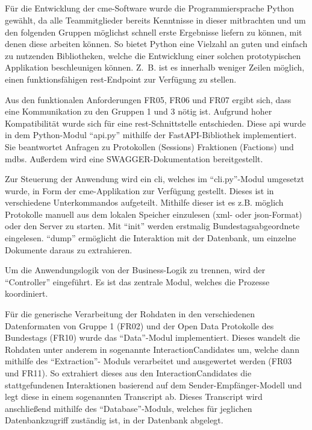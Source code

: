 \subsection{}
Für die Entwicklung der \gls{cme}-Software wurde die Programmiersprache Python
gewählt, da alle Teammitglieder bereits Kenntnisse in dieser mitbrachten und
um den folgenden Gruppen möglichst schnell erste Ergebnisse liefern zu können,
mit denen diese arbeiten können. So bietet Python eine Vielzahl an guten und
einfach zu nutzenden Bibliotheken, welche die Entwicklung einer solchen
prototypischen Applikation beschleunigen können. Z.~B. ist es innerhalb
weniger Zeilen möglich, einen funktionsfähigen \gls{rest}-Endpoint zur
Verfügung zu stellen.

Aus den funktionalen Anforderungen FR05, FR06 und FR07 ergibt sich, dass eine
Kommunikation zu den Gruppen 1 und 3 nötig ist. Aufgrund hoher Kompatibilität
wurde sich für eine \gls{rest}-Schnittstelle entschieden. Diese \gls{api} wurde in dem
Python-Modul \enquote{api.py} mithilfe der FastAPI-Bibliothek implementiert. Sie
beantwortet Anfragen zu Protokollen (Sessions) Fraktionen (Factions) und
\glspl{mdb}. Außerdem wird eine SWAGGER-Dokumentation
bereitgestellt.

Zur Steuerung der Anwendung wird ein \gls{cli}, welches im \enquote{cli.py}-Modul umgesetzt
wurde, in Form der \gls{cme}-Applikation zur Verfügung gestellt. Dieses ist in
verschiedene Unterkommandos aufgeteilt. Mithilfe dieser ist es z.B. möglich
Protokolle manuell aus dem lokalen Speicher einzulesen (\gls{xml}- oder \gls{json}-Format)
oder den Server zu starten. Mit \enquote{init} werden erstmalig Bundestagsabgeordnete
eingelesen. \enquote{dump} ermöglicht die Interaktion mit der Datenbank, um einzelne
Dokumente daraus zu extrahieren.

Um die Anwendungslogik von der Business-Logik zu trennen, wird der \enquote{Controller}
eingeführt. Es ist das zentrale Modul, welches die Prozesse koordiniert.

Für die generische Verarbeitung der Rohdaten in den verschiedenen Datenformaten
von Gruppe 1 (FR02) und der Open Data Protokolle des Bundestags (FR10) wurde
das \enquote{Data}-Modul implementiert. Dieses wandelt die Rohdaten unter anderem in
sogenannte InteractionCandidates um, welche dann mithilfe des \enquote{Extraction}-
Moduls verarbeitet und ausgewertet werden (FR03 und FR11). So extrahiert dieses
aus den InteractionCandidates die stattgefundenen Interaktionen basierend auf
dem Sender-Empfänger-Modell und legt diese in einem sogenannten Transcript ab.
Dieses Transcript wird anschließend mithilfe des \enquote{Database}-Moduls, welches für
jeglichen Datenbankzugriff zuständig ist, in der Datenbank abgelegt.


